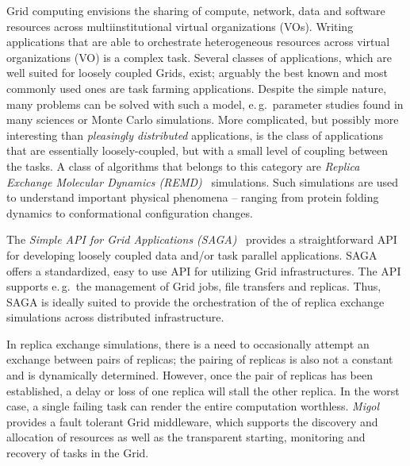 \documentclass[times, 10pt,twocolumn]{article}
\begin{document}
Grid computing envisions the sharing of compute, network, data and
software resources across multiinstitutional virtual organizations
(VOs). Writing applications that are able to orchestrate heterogeneous
resources across virtual organizations (VO) is a complex task.  Several 
classes of applications, which are well suited for loosely
coupled Grids, exist; arguably the best known and most commonly used ones are
task farming applications. Despite the simple nature, many problems
can be solved with such a model, e.\,g.\ parameter studies found in
many sciences or Monte Carlo simulations. More
complicated, but possibly more interesting than {\it pleasingly
  distributed} applications, is the class of applications that are
essentially loosely-coupled, but with a small level of coupling
between the tasks.   A class of algorithms that belongs to this category are
\emph{Replica Exchange Molecular Dynamics (REMD)}~\cite{hansmann,Sugita:1999rm} simulations.
Such simulations are used to understand important physical
phenomena -- ranging from protein folding dynamics to conformational
configuration changes.

The \emph{Simple API for Grid Applications (SAGA)}~\cite{saga_gfd90}
provides a straightforward API for developing loosely coupled data and/or task
parallel applications.
SAGA offers a standardized, easy to use API for utilizing Grid
infrastructures. The API supports e.\,g.\ the management of Grid jobs,
file transfers and replicas. Thus, SAGA is ideally suited to provide
the orchestration of the of replica exchange simulations across
distributed infrastructure.
                                                         
In replica exchange simulations, there is a need to occasionally attempt an exchange
between pairs of replicas; the pairing of replicas is also not a
constant and is dynamically determined. However, once the pair of
replicas has been established, a delay or loss of one replica will
stall the other replica. In the worst case, a single failing task can
render the entire computation worthless.
\emph{Migol}~\cite{schnorLuckow08} provides a fault tolerant Grid
middleware, which supports the discovery and allocation of resources
as well as the transparent starting, monitoring and recovery of tasks in the Grid.          
\end{document}
